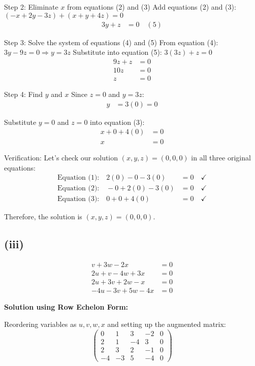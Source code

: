 \documentclass[12pt]{article}
\begin{document}
Step 2: Eliminate $x$ from equations (2) and (3)
Add equations (2) and (3): $(-x + 2y - 3z) + (x + y + 4z) = 0$
\begin{align}
3y + z &= 0 \quad (5)
\end{align}

Step 3: Solve the system of equations (4) and (5)
From equation (4): $3y - 9z = 0 \Rightarrow y = 3z$
Substitute into equation (5): $3(3z) + z = 0$
\begin{align*}
9z + z &= 0\\
10z &= 0\\
z &= 0
\end{align*}

Step 4: Find $y$ and $x$
Since $z = 0$ and $y = 3z$:
\begin{align*}
y &= 3(0) = 0
\end{align*}

Substitute $y = 0$ and $z = 0$ into equation (3):
\begin{align*}
x + 0 + 4(0) &= 0\\
x &= 0
\end{align*}

Verification: Let's check our solution $(x, y, z) = (0, 0, 0)$ in all three original equations:
\begin{align*}
\text{Equation (1):} \quad 2(0) - 0 - 3(0) &= 0 \quad \checkmark\\
\text{Equation (2):} \quad -0 + 2(0) - 3(0) &= 0 \quad \checkmark\\
\text{Equation (3):} \quad 0 + 0 + 4(0) &= 0 \quad \checkmark
\end{align*}

Therefore, the solution is $\boxed{(x, y, z) = (0, 0, 0)}$.

\subsection*{(iii)}
\begin{align*}
v + 3w - 2x &= 0\\
2u + v - 4w + 3x &= 0\\
2u + 3v + 2w - x &= 0\\
-4u - 3v + 5w - 4x &= 0
\end{align*}

\textbf{Solution using Row Echelon Form:}

Reordering variables as $u, v, w, x$ and setting up the augmented matrix:
\[
\left(\begin{array}{cccc|c}
0 & 1 & 3 & -2 & 0\\
2 & 1 & -4 & 3 & 0\\
2 & 3 & 2 & -1 & 0\\
-4 & -3 & 5 & -4 & 0
\end{array}\right)
\]
\end{document}

